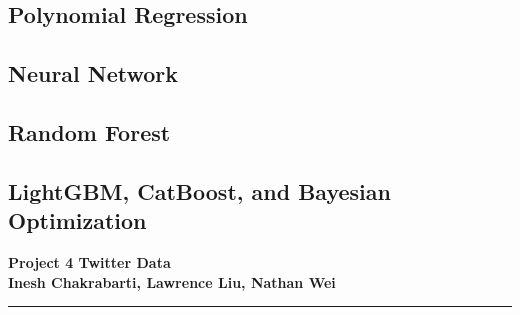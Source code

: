 \documentclass[11pt,letterpaper]{article}
\begin{document}
\subsection*{Polynomial Regression}

\subsection*{Neural Network}

\subsection*{Random Forest}

\subsection*{LightGBM, CatBoost, and Bayesian Optimization}
\pagebreak
\begin{center}
    \begin{minipage}{10cm}
    	\begin{center}
    	\textbf{\large Project 4 Twitter Data}\\[0.1cm]
        \textbf{Inesh Chakrabarti, Lawrence Liu, Nathan Wei}\\[0.1cm]
    	\end{center}
    \end{minipage}\hfill
\end{center}
\rule{17cm}{0.1mm}



\end{document}
